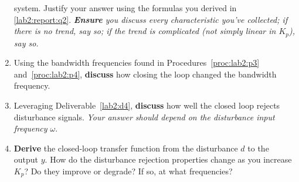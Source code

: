 \begin{deliverable}[label={lab2:report}]
\begin{enumerate}[label={(\arabic*)}]
{      system. Justify your answer using the formulas you derived in
      \ref{lab2:report:q2}.
      \emph{\textbf{Ensure} you discuss every characteristic
      you've collected; if there is no trend, say so; if the trend is
      complicated (not simply linear in \(K_p\)), say so.}
      \label{lab2:report:q4}
    }
    \item{
      Using the bandwidth frequencies found in Procedures~\ref{proc:lab2:p3}
      and~\ref{proc:lab2:p4}, \textbf{discuss} how closing the loop
      changed the bandwidth frequency.
      \label{lab2:report:q5}
    }
    \item{
      Leveraging Deliverable~\ref{lab2:d4}, \textbf{discuss} how well the
      closed loop rejects disturbance signals.
      \emph{Your answer should depend on the disturbance input frequency
      \(\omega.\)}
      \label{lab2:report:q6}
    }
    \item{
      \textbf{Derive} the closed-loop transfer function from the
      disturbance \(d\) to the output \(y.\) How do the disturbance rejection
      properties change as you increase \(K_p\)? Do they improve or degrade?
      If so, at what frequencies?
      \label{lab2:report:q8}
    }
  \end{enumerate}
\end{deliverable}

